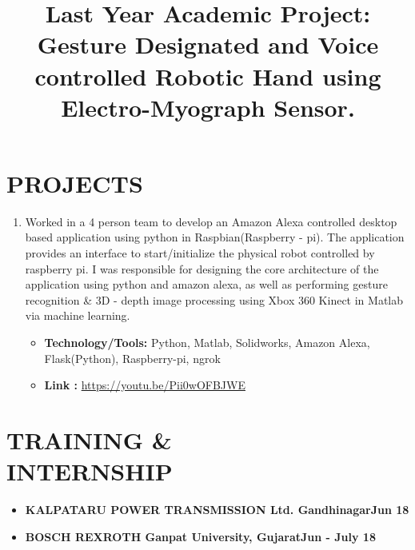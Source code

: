 \documentclass[margin]{res}
\begin{document}
\begin{resume}
    \section{PROJECTS}
    \begin{enumerate}
        \item 
    \location{}
    \title{\textbf{Last Year Academic Project: Gesture Designated and Voice controlled Robotic Hand using Electro-Myograph Sensor.}}
    \begin{position}
        Worked in a 4 person team to develop an Amazon Alexa controlled desktop based application using python in Raspbian(Raspberry - pi). The application provides an interface to start/initialize the physical robot controlled by raspberry pi. I was responsible for designing the core architecture of the application using python and amazon alexa, as well as performing gesture recognition \& 3D - depth image processing using Xbox 360 Kinect in Matlab via machine learning.
    \begin{itemize}
    \item \textbf{Technology/Tools:} Python, Matlab, Solidworks, Amazon Alexa,\\ 
    Flask(Python), Raspberry-pi, ngrok
    \item \textbf{Link :} \href{https://youtu.be/Pii0wOFBJWE}{https://youtu.be/Pii0wOFBJWE}
    \end{itemize}
    \end{position}
    \end{enumerate}
        
    \section{TRAINING \& \\INTERNSHIP}
    \begin{itemize}
        \item \textbf{\normalsize KALPATARU POWER TRANSMISSION Ltd. Gandhinagar\hfill{Jun 18}}
        \item \textbf{\normalsize BOSCH REXROTH Ganpat University, Gujarat\hfill{Jun - July 18}}
    \end{itemize}
    \end{resume}
\end{document}
